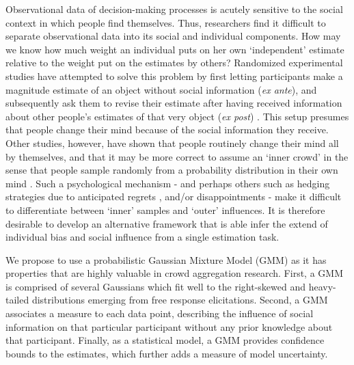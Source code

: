 \documentclass[9pt,a4paper,twocolumn,lineno]{article}
\begin{document}
Observational data of decision-making processes is acutely sensitive to the social context in which people find themselves. Thus, researchers find it difficult to separate observational data into its social and individual components. How may we know how much weight an individual puts on her own ‘independent’ estimate relative to the weight put on the estimates by others? Randomized experimental studies have attempted to solve this problem by first letting participants make a magnitude estimate of an object without social information (\textit{ex ante}), and subsequently ask them to revise their estimate after having received information about other people’s estimates of that very object (\textit{ex post}) \cite{becker2017network, jayles2017social, lorenz2011social, sniezek1995cueing, mavrodiev2013quantifying}. This setup %
presumes that people change their mind because of the social information they receive. Other studies, however, have shown that people routinely change their mind all by themselves, and that it may be more correct to assume an `inner crowd' in the sense that people sample randomly from a probability distribution in their own mind \cite{vul2008measuring, herzog2009wisdom, herzog2014harnessing}. Such a psychological mechanism - and perhaps others such as hedging strategies due to anticipated regrets \cite{bell1982regret}, and/or disappointments \cite{loomes1986disappointment} - make it difficult to differentiate between `inner' samples and `outer' influences. It is therefore desirable to develop an alternative framework that is able infer the extend of individual bias and social influence from a single estimation task.

We propose to use a probabilistic Gaussian Mixture Model (GMM) as it has properties that are highly valuable in crowd aggregation research. First, a GMM is comprised of several Gaussians which fit well to the right-skewed and heavy-tailed distributions emerging from free response elicitations. Second, a GMM associates a measure to each data point, describing the influence of social information on that particular participant without any prior knowledge about that participant. Finally, as a statistical model, a GMM provides confidence bounds to the estimates, which further adds a measure of model uncertainty.
\end{document}
